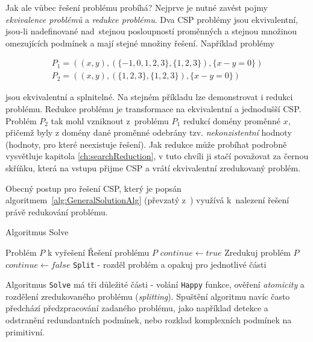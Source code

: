 Jak ale vůbec řešení problému probíhá? Nejprve je nutné zavést pojmy \emph{ekvivalence problémů} a \emph{redukce problému}. Dva CSP problémy jsou ekvivalentní, jsou-li nadefinované nad~stejnou posloupností proměnných a stejnou množinou omezujících podmínek a mají stejné množiny řešení. Například problémy

\begin{align*}
P_1 = ((x, y), (\{-1,0,1,2,3\}, \{1,2,3\}), \{x - y = 0\}) \\
P_2 = ((x, y), (\{1,2,3\}, \{1,2,3\}), \{x - y = 0\})
\end{align*}

jsou ekvivalentní a splnitelné. Na stejném příkladu lze demonstrovat i redukci problému. Redukce problému je transformace na ekvivalentní a jednodušší CSP. Problém $P_2$ tak mohl vzniknout z~problému $P_1$ redukcí domény proměnné $x$, přičemž byly z domény dané proměnné odebrány tzv. \emph{nekonzistentní} hodnoty (hodnoty, pro které neexistuje řešení). Jak redukce může probíhat podrobně vysvětluje kapitola \ref{ch:searchReduction}, v tuto chvíli ji stačí považovat za černou skříňku, která na vstupu přijme CSP a vrátí ekvivalentní zredukovaný problém.

Obecný postup pro řešení CSP, který je popsán algoritmem~\ref{alg:GeneralSolutionAlg} (převzatý z~\cite[s.~22]{Vu2005}) využívá k~nalezení řešení právě redukování problému.

\begin{algorithm}
\caption{Algoritmus Solve}
\label{alg:GeneralSolutionAlg}
\begin{algorithmic}[1]
\Require Problém $P$ k vyřešení
\Ensure Řešení problému $P$
\State $continue \gets true$
\State Zredukuj problém $P$
\State $continue \gets false$
\Else
\State \verb|Split| - rozděl problém a opakuj pro jednotlivé části
\EndIf
\EndIf
\EndWhile
\EndProcedure
\end{algorithmic}
\end{algorithm}

Algoritmus \verb|Solve| má tři důležité části - volání \verb|Happy| funkce, ověření \emph{atomicity} a rozdělení zredukovaného problému (\emph{splitting}). Spuštění algoritmu navíc často předchází předzpracování zadaného problému, jako například detekce a odstranění redundantních podmínek, nebo rozklad komplexních podmínek na primitivní.


